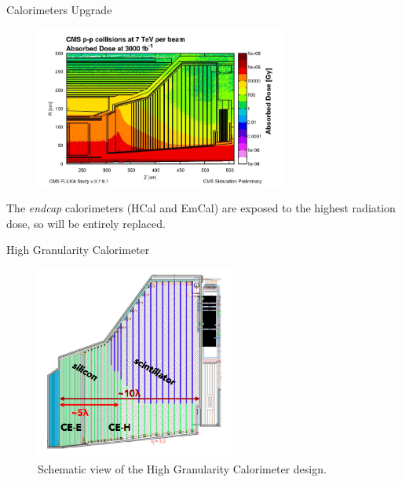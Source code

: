 \documentclass[10pt]{beamer}
\begin{document}
\begin{frame}{Calorimeters Upgrade}
    
    \begin{figure}
        \centering
        \includegraphics[height=150pt]{img/upgrade/doseRad.png}
    \end{figure}{}
    
    The \emph{endcap} calorimeters (HCal and EmCal) are exposed to the highest radiation dose, so will be entirely replaced.
\end{frame}

\begin{frame}{High Granularity Calorimeter}
    \begin{figure}
         \centering
         \includegraphics[height=180pt]{./img/upgrade/HGCalScheme.png}
         \caption{Schematic view of the High Granularity Calorimeter design.}
         \label{fig:my_label}
     \end{figure}{}
\end{frame}{}
\end{document}
